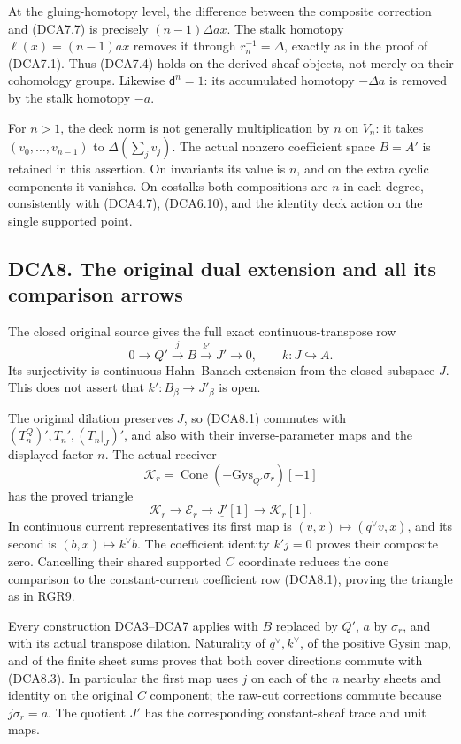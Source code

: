 At the gluing-homotopy level, the difference between the composite
correction and (DCA7.7) is precisely \((n-1)\Delta ax\). The stalk
homotopy \(\ell(x)=(n-1)ax\) removes it through \(r_n^{-1}=\Delta\),
exactly as in the proof of (DCA7.1). Thus (DCA7.4) holds on the derived
sheaf objects, not merely on their cohomology groups. Likewise
\(\mathsf d^n=1\): its accumulated homotopy \(-\Delta a\) is removed by
the stalk homotopy \(-a\).

For \(n>1\), the deck norm is not generally multiplication by \(n\) on
\(V_n\): it takes \((v_0,\ldots,v_{n-1})\) to \(\Delta(\sum_jv_j)\). The
actual nonzero coefficient space \(B=A'\) is retained in this assertion.
On invariants its value is \(n\), and on the extra cyclic components it
vanishes. On costalks both compositions are \(n\) in each degree,
consistently with (DCA4.7), (DCA6.10), and the identity deck action on
the single supported point.

\subsection{DCA8. The original dual extension and all its comparison
arrows}\label{dca8.-the-original-dual-extension-and-all-its-comparison-arrows}

The closed original source gives the full exact continuous-transpose row
\[
0\longrightarrow Q'\xrightarrow jB\xrightarrow{k'}J'\longrightarrow0,
\qquad k:J\hookrightarrow A.
\tag{DCA8.1}
\] Its surjectivity is continuous Hahn--Banach extension from the closed
subspace \(J\). This does not assert that \(k':B_\beta\to J'_\beta\) is
open.

The original dilation preserves \(J\), so (DCA8.1) commutes with
\((T_n^Q)',T_n',(T_n|_J)'\), and also with their inverse-parameter maps
and the displayed factor \(n\). The actual receiver \[
\mathscr K_r=\operatorname{Cone}(-\mathrm{Gys}_{Q'}\sigma_r)[-1]
\tag{DCA8.2}
\] has the proved triangle \[
\mathscr K_r\longrightarrow\mathscr E_r
\longrightarrow\underline{J'}[1]\longrightarrow\mathscr K_r[1].
\tag{DCA8.3}
\] In continuous current representatives its first map is
\((v,x)\mapsto(q^\vee v,x)\), and its second is
\((b,x)\mapsto k^\vee b\). The coefficient identity \(k'j=0\) proves
their composite zero. Cancelling their shared supported \(C\) coordinate
reduces the cone comparison to the constant-current coefficient row
(DCA8.1), proving the triangle as in RGR9.

Every construction DCA3--DCA7 applies with \(B\) replaced by \(Q'\),
\(a\) by \(\sigma_r\), and with its actual transpose dilation.
Naturality of \(q^\vee,k^\vee\), of the positive Gysin map, and of the
finite sheet sums proves that both cover directions commute with
(DCA8.3). In particular the first map uses \(j\) on each of the \(n\)
nearby sheets and identity on the original \(C\) component; the raw-cut
corrections commute because \(j\sigma_r=a\). The quotient \(J'\) has the
corresponding constant-sheaf trace and unit maps.

